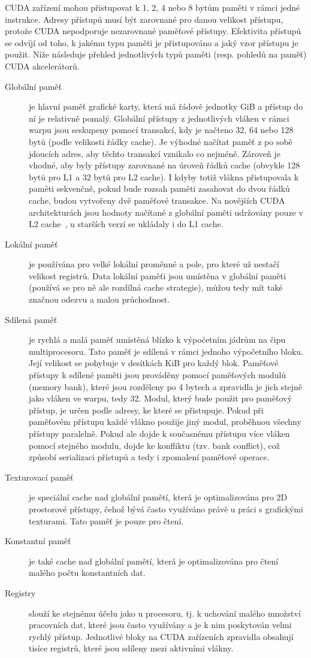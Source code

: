 CUDA zařízení mohou přistupovat k 1, 2, 4 nebo 8 bytům paměti v rámci jedné instrukce. Adresy přístupů musí být zarovnané pro danou velikost přístupu, protože CUDA nepodporuje nezarovnané paměťové přístupy. Efektivita přístupů se odvíjí od toho, k jakému typu paměti je přistupováno a jaký vzor přístupu je použit. Níže následuje přehled jednotlivých typů paměti (resp. pohledů na paměť) CUDA akcelerátorů.
\begin{description}
    \item[Globální paměť] je hlavní paměť grafické karty, která má řádově jednotky GiB a přístup do ní je relativně pomalý. Globální přístupy z jednotlivých vláken v rámci warpu jsou seskupeny pomocí transakcí, kdy je načteno 32, 64 nebo 128 bytů (podle velikosti řádky cache). Je výhodné načítat paměť z po sobě jdoucích adres, aby těchto transakcí vznikalo co nejméně. Zároveň je vhodné, aby byly přístupy zarovnané na úroveň řádků cache (obvykle 128 bytů pro L1 a 32 bytů pro L2 cache). I kdyby totiž vlákna přistupovala k paměti sekvenčně, pokud bude rozsah paměti zasahovat do dvou řádků cache, budou vytvořeny dvě paměťové transakce. Na novějších CUDA architekturách jsou hodnoty načítané z globální paměti udržovány pouze v L2 cache~\cite{cudacguide}, u starších verzí se ukládaly i do L1 cache.
    \item[Lokální paměť] je používána pro velké lokální proměnné a pole, pro které už nestačí velikost registrů. Data lokální paměťi jsou umístěna v globální paměti (používá se pro ně ale rozdílná cache strategie), můžou tedy mít také značnou odezvu a malou průchodnost.
    \item[Sdílená paměť] je rychlá a malá paměť umístěná blízko k výpočetním jádrům na čipu multiprocesoru. Tato paměť je sdílená v rámci jednoho výpočetního bloku. Její velikost se pohybuje v desítkách KiB pro každý blok. Paměťové přístupy k sdílené paměti jsou prováděny pomocí paměťových modulů (memory bank), které jsou rozděleny po 4 bytech a zpravidla je jich stejně jako vláken ve warpu, tedy 32. Modul, který bude použit pro paměťový přístup, je určen podle adresy, ke které se přistupuje. Pokud při paměťovém přístupu každé vlákno použije jiný modul, proběhnou všechny přístupy paralelně. Pokud ale dojde k současnému přístupu více vláken pomocí stejného modulu, dojde ke konfliktu (tzv. bank conflict), což způsobí serializaci přístupů a tedy i zpomalení paměťové operace.
    \item[Texturovací paměť] je speciální cache nad globální pamětí, která je optimalizována pro 2D prostorové přístupy, čehož bývá často využíváno právě u práci s grafickými texturami. Tato paměť je pouze pro čtení.
    \item[Konstantní paměť] je také cache nad globální pamětí, která je optimalizována pro čtení malého počtu konstantních dat.
    \item[Registry] slouží ke stejnému účelu jako u procesoru, tj. k uchování malého množství pracovních dat, které jsou často využívány a je k nim poskytován velmi rychlý přístup. Jednotlivé bloky na CUDA zařízeních zpravidla obsahují tisíce registrů, které jsou sdíleny mezi aktivními vlákny.
\end{description}

